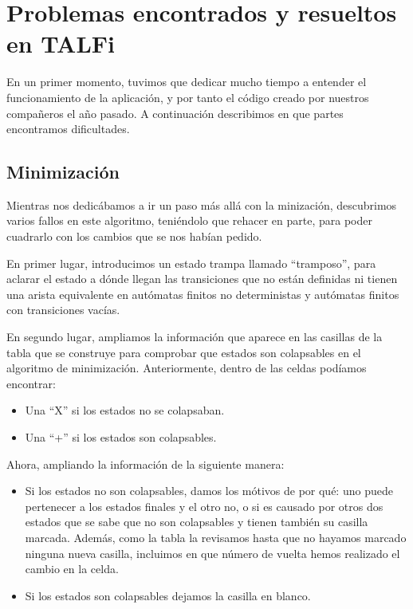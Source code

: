 \documentclass[12pt,a4paper,spanish]{book}
\begin{document}
\section{Problemas encontrados y resueltos en TALFi}
En un primer momento, tuvimos que dedicar mucho tiempo a entender el funcionamiento de la aplicaci\'on, y por tanto el c\'odigo creado por nuestros compa\~neros el a\~no pasado. A continuaci\'on describimos en que partes encontramos dificultades.

\subsection{Minimizaci\'on}

Mientras nos dedic\'abamos a ir un paso m\'as all\'a con la minizaci\'on, descubrimos varios fallos en este algoritmo, teni\'endolo que rehacer en parte, para poder cuadrarlo con los cambios que se nos hab\'ian pedido.

En primer lugar, introducimos un estado trampa llamado ``tramposo'', para aclarar el estado a d\'onde llegan las transiciones que no est\'an definidas ni tienen una arista equivalente en aut\'omatas finitos no deterministas y aut\'omatas finitos con transiciones vac\'ias.

En segundo lugar, ampliamos la informaci\'on que aparece en las casillas de la tabla que se construye para comprobar que estados son colapsables en el algoritmo de minimizaci\'on. Anteriormente, dentro de las celdas pod\'iamos encontrar:

\begin{itemize}

\item Una ``X'' si los estados no se colapsaban.

\item Una ``+'' si los estados son colapsables.

\end{itemize}

Ahora, ampliando la informaci\'on de la siguiente manera:

\begin{itemize}

\item Si los estados no son colapsables, damos los m\'otivos de por qu\'e: uno puede pertenecer a los estados finales y el otro no, o si es causado por otros dos estados que se sabe que no son colapsables y tienen tambi\'en su casilla marcada. Adem\'as, como la tabla la revisamos hasta que no hayamos marcado ninguna nueva casilla, incluimos en que n\'umero de vuelta hemos realizado el cambio en la celda.

\item Si los estados son colapsables dejamos la casilla en blanco.

\end{itemize}
\end{document}
